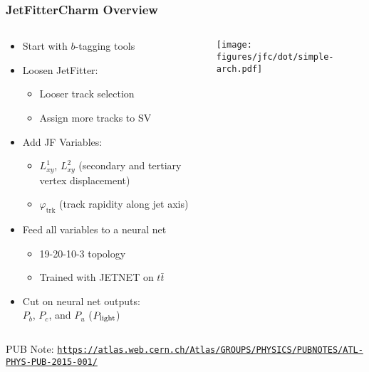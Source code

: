 \documentclass[usenames,dvipsnames]{beamer}
\begin{document}
\begin{frame}
  \frametitle{JetFitterCharm Overview}
  \begin{columns}
    \begin{column}{0.6\textwidth}
      \begin{itemize}
      \item Start with $b$-tagging tools
      \item Loosen JetFitter:
        \begin{itemize}
        \item Looser track selection
        \item Assign more tracks to SV
        \end{itemize}
      \item Add JF Variables:
        \begin{itemize}
        \item $L_{xy}^1$, $L_{xy}^2$ (secondary and tertiary vertex displacement)
        \item $\varphi_{\textrm{trk}}$ (track rapidity along jet axis)
        \end{itemize}
      \item Feed all variables to a neural net
        \begin{itemize}
        \item 19-20-10-3 topology
        \item Trained with JETNET on $t\bar{t}$
        \end{itemize}
      \item Cut on neural net outputs: \\
        $P_{b}$, $P_{c}$, and $P_{u}$ ($P_{\rm light}$)
      \end{itemize}
    \end{column}
    \begin{column}{0.4\textwidth}
      \texttt{[image: figures/jfc/dot/simple-arch.pdf]}
    \end{column}
  \end{columns}
  \vspace{1em}
    \begin{tiny}
      PUB Note: \texttt{\url{https://atlas.web.cern.ch/Atlas/GROUPS/PHYSICS/PUBNOTES/ATL-PHYS-PUB-2015-001/}}
    \end{tiny}
\end{frame}
\end{document}
